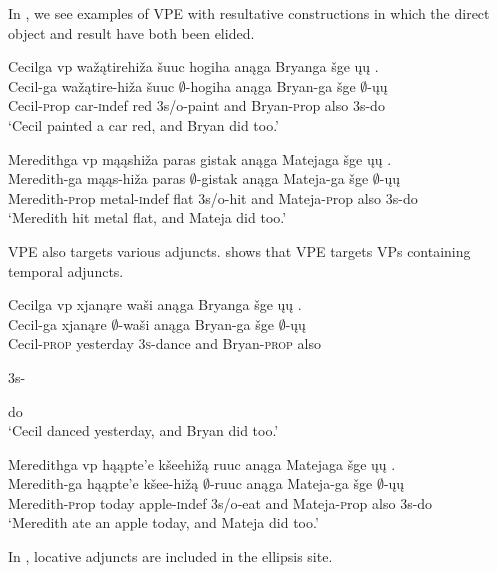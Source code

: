 \documentclass[output=paper]{LSP/langsci}
\begin{document}
In , we see examples of VPE with resultative constructions in which the direct object and result have both been elided. 
 
\ea\label{ex:johnson:6}
\ea\label{ex:johnson:6a} 
\glll Cecilga  {\ob}{vp} wažątirehiža šuuc hogiha{\cb} anąga Bryanga šge {\ob}ųų{\cb} .\\
Cecil-ga {} wažątire-hiža šuuc $\emptyset$-hogiha anąga Bryan-ga šge $\emptyset$-ųų\\
Cecil-{\textsc prop} {} car-{\textsc indef} red {\textsc 3s/o}-paint and Bryan-{\textsc prop} also {\textsc 3s}-do\\
\trans `Cecil painted a car red, and Bryan did too.'
 
\ex\label{ex:johnson:6b} 
\glll Meredithga  {\ob}{vp} mąąshiža paras gistak{\cb} anąga Matejaga šge {\ob}ųų{\cb} .\\
Meredith-ga {} mąąs-hiža paras $\emptyset$-gistak anąga Mateja-ga šge $\emptyset$-ųų\\
Meredith-{\textsc prop} {} metal-{\textsc indef} flat {\textsc 3s/o}-hit and Mateja-{\textsc prop} also {\textsc 3s}-do\\
\trans `Meredith hit metal flat, and Mateja did too.'
\z
\z

VPE also targets various adjuncts.  shows that VPE targets VPs containing temporal adjuncts. 
 
\ea\label{ex:johnson:7}
\ea 
\glll Cecilga {\ob}{vp} xjanąre waši{\cb} anąga Bryanga šge {\ob}ųų{\cb} .\\
Cecil-ga {} xjanąre $\emptyset$-waši anąga Bryan-ga šge $\emptyset$-ųų\\
Cecil-\textsc{prop} {} yesterday \textsc{3s}-dance and Bryan-\textsc{prop} also \begin{sc}3s-\end{sc}do\\
\trans `Cecil danced yesterday, and Bryan did too.'

\ex 
\glll Meredithga  {\ob}{vp} hąąpte'e kšeehižą ruuc{\cb} anąga Matejaga šge {\ob}ųų{\cb} .\\
Meredith-ga {} hąąpte'e kšee-hižą $\emptyset$-ruuc anąga Mateja-ga šge $\emptyset$-ųų\\
Meredith-{\textsc prop} {} today apple-{\textsc indef} {\textsc 3s/o}-eat and Mateja-{\textsc prop} also {\textsc 3s}-do\\
\trans `Meredith ate an apple today, and Mateja did too.'
\z
\z

In , locative adjuncts are included in the ellipsis site. 
 
\end{document}
